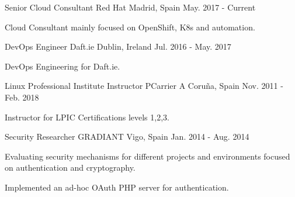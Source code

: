 

\begin{cventries}

  \cventry
    {Senior Cloud Consultant} %
    {Red Hat} %
    {Madrid, Spain} %
    {May. 2017 - Current} %
    {
      \begin{cvitems} %
        \item {Cloud Consultant mainly focused on OpenShift, K8s and automation.}
      \end{cvitems}
    }
  \cventry
    {DevOps Engineer} %
    {Daft.ie} %
    {Dublin, Ireland} %
    {Jul. 2016 - May. 2017} %
    {
      \begin{cvitems} %
        \item {DevOps Engineering for Daft.ie.}
      \end{cvitems}
    }
  \cventry
    {Linux Professional Institute Instructor} %
    {PCarrier} %
    {A Coruña, Spain} %
    {Nov. 2011 - Feb. 2018} %
    {
      \begin{cvitems} %
        \item {Instructor for LPIC Certifications levels 1,2,3.}
      \end{cvitems}
    }
  \cventry
    {Security Researcher} %
    {GRADIANT} %
    {Vigo, Spain} %
    {Jan. 2014 - Aug. 2014} %
    {
      \begin{cvitems} %
        \item {Evaluating security mechanisms for different projects and environments focused on authentication and cryptography.}
        \item {Implemented an ad-hoc OAuth PHP server for authentication.}

\end{cvitems}}
\end{cventries}
